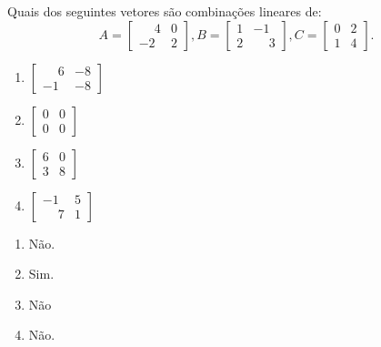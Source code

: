 \documentclass[12pt]{exam}
\begin{document}
\begin{exercicio}
    Quais dos seguintes vetores são combinações lineares de:
    \[
        A = \begin{bmatrix}
            \phantom{-} 4 & 0\\-2 & 2
        \end{bmatrix},
        B = \begin{bmatrix}
            1 & -1\\2 & \phantom{-} 3
        \end{bmatrix},
        C = \begin{bmatrix}
            0 & 2\\1 & 4
        \end{bmatrix}.
    \]
    \begin{multicols}{2}
        \begin{enumerate}[label={\alph*})]
            \item $\begin{bmatrix}
                \phantom{-} 6 & -8\\-1 & -8
            \end{bmatrix}$

            \item $\begin{bmatrix}
                0 & 0\\0 & 0
            \end{bmatrix}$

            \item $\begin{bmatrix}
                6 & 0\\3 & 8
            \end{bmatrix}$

            \item $\begin{bmatrix}
                -1 & 5\\\phantom{-} 7 & 1
            \end{bmatrix}$
        \end{enumerate}
    \end{multicols}
    \begin{solucao}
      \begin{multicols}{2}
        \begin{enumerate}[label={\alph*})]
          \item Não.

          \item Sim.

          \item Não

          \item Não.
        \end{enumerate}
      \end{multicols}
    \end{solucao}
\end{exercicio}
\end{document}
